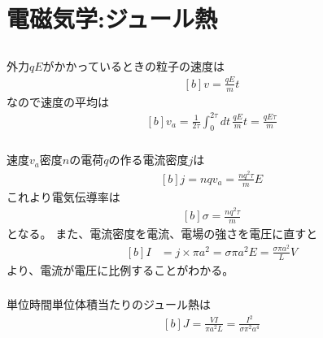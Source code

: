 \documentclass[../ap_2012.tex]{subfiles}
\begin{document}
\setcounter{chapter}{1}
\chapter{電磁気学:ジュール熱}
\section{}
\subsection{}
外力\(qE\)がかかっているときの粒子の速度は
\begin{equation}\begin{aligned}[b]
    v = \frac{qE}{m}t
\end{aligned}\end{equation}
なので速度の平均は
\begin{equation}\begin{aligned}[b]
    v_a = \frac{1}{2\tau}\int_{0}^{2\tau}dt\, \frac{qE}{m}t = \frac{qE\tau}{m}
\end{aligned}\end{equation}

\subsection{}
速度\(v_a\)密度\(n\)の電荷\(q\)の作る電流密度\(j\)は
\begin{equation}\begin{aligned}[b]
    j = nqv_a = \frac{nq^2\tau}{m}E
\end{aligned}\end{equation}
これより電気伝導率は
\begin{equation}\begin{aligned}[b]
    \sigma = \frac{nq^2\tau}{m}
\end{aligned}\end{equation}
となる。
また、電流密度を電流、電場の強さを電圧に直すと
\begin{equation}\begin{aligned}[b]
    I &= j \times \pi a^2 = \sigma \pi a^2 E =\frac{\sigma \pi a^2}{L} V
\end{aligned}\end{equation}
より、電流が電圧に比例することがわかる。

\subsection{}
単位時間単位体積当たりのジュール熱は
\begin{equation}\begin{aligned}[b]
    J=\frac{VI}{\pi a^2L} = \frac{I^2}{\sigma \pi^2a^4}
\end{aligned}\end{equation}
\end{document}
